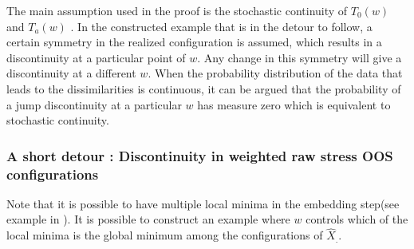 \documentclass[11pt]{article} %
\begin{document}
The main assumption  used in the proof is the stochastic continuity of $T_0(w)$ and $T_a(w)$ .  In the constructed example that is in the detour to follow,  a certain symmetry in the realized configuration is assumed, which results in a discontinuity at a particular  point of $w$. Any change in this symmetry will give a discontinuity at a different $w$. When the probability distribution of the data that leads to the dissimilarities is continuous, it can be argued that the probability of a  jump discontinuity at  a particular $w$ has measure zero which is equivalent to stochastic continuity.

\subsubsection{ A short detour : Discontinuity in weighted raw stress OOS configurations\label{subsubsec:Discontinuity}}

Note that it is possible to have multiple local minima in the embedding step(see example in \cite{TrossetLocalMin}). It is possible to construct an example  where $w$ controls which of the local minima is the global minimum among the configurations of $\hat{X}_{.}$.

\end{document}
